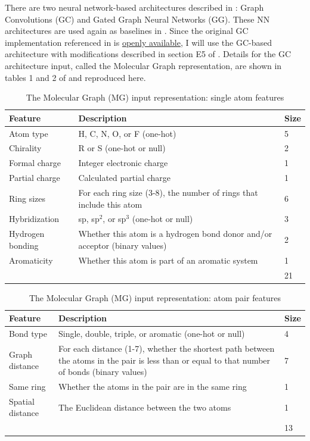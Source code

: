 \documentclass[12pt]{article}
\begin{document}
There are two neural network-based architectures described in \parencite{2017arXiv170205532F}: Graph Convolutions \cite{Kearnes2016} (GC) and Gated Graph Neural Networks \cite{2015arXiv151105493L} (GG). These NN architectures are used again as baselines in \parencite{2017arXiv170401212G}. Since the original GC implementation referenced in \parencite{2017arXiv170205532F} is \href{https://github.com/tkipf/gcn}{openly available}\cite{kipf2016semi}, I will use the GC-based architecture with modifications described in section E5 of \parencite{2017arXiv170205532F}. Details for the GC architecture input, called the Molecular Graph representation, are shown in tables 1 and 2 of \parencite{2017arXiv170205532F} and reproduced here.

\begin{table}[htbp]
\caption{\label{tab:org723795e}
The Molecular Graph (MG) input representation: single atom features}
\centering
\begin{tabu}{|lp{10.25cm}l|}
Feature & Description & Size\\
\hline
Atom type & H, C, N, O, or F (one-hot) & 5\\
Chirality & R or S (one-hot or null) & 2\\
Formal charge & Integer electronic charge & 1\\
Partial charge & Calculated partial charge & 1\\
Ring sizes & For each ring size (3-8), the number of rings that include this atom & 6\\
Hybridization & sp, sp\(^2\), or sp\(^3\) (one-hot or null) & 3\\
Hydrogen bonding & Whether this atom is a hydrogen bond donor and/or acceptor (binary values) & 2\\
Aromaticity & Whether this atom is part of an aromatic system & 1\\
\hline
 &  & 21\\
\end{tabu}
\end{table}

\begin{table}[htbp]
\caption{\label{tab:org5d60017}
The Molecular Graph (MG) input representation: atom pair features}
\centering
\begin{tabu}{|lp{10.25cm}l|}
Feature & Description & Size\\
\hline
Bond type & Single, double, triple, or aromatic (one-hot or null) & 4\\
Graph distance & For each distance (1-7), whether the shortest path between the atoms in the pair is less than or equal to that number of bonds (binary values) & 7\\
Same ring & Whether the atoms in the pair are in the same ring & 1\\
Spatial distance & The Euclidean distance between the two atoms & 1\\
\hline
 &  & 13\\
\end{tabu}
\end{table}
\end{document}
